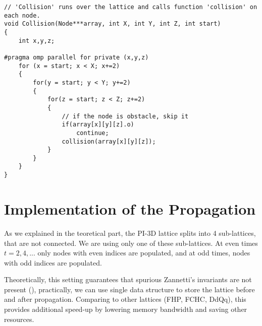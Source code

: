 \begin{lstlisting}
// 'Collision' runs over the lattice and calls function 'collision' on each node. 
void Collision(Node***array, int X, int Y, int Z, int start)
{
	int x,y,z;

#pragma omp parallel for private (x,y,z)
	for (x = start; x < X; x+=2)
	{
		for(y = start; y < Y; y+=2)
		{
			for(z = start; z < Z; z+=2)
			{
				// if the node is obstacle, skip it
				if(array[x][y][z].o)
					continue;
				collision(array[x][y][z]);
			}
		}
	}
}
\end{lstlisting}


\section{Implementation of the Propagation}


As we explained in the teoretical part, the PI-3D lattice splits into 4 sub-lattices, that are not connected. We are using only one of these sub-lattices. At even times $t=2,4,...$ only nodes with even indices are populated, and at odd times, nodes with odd indices are populated.

Theoretically, this setting guarantees that spurious Zannetti's invariants are not present (\cite{nasilowski}), practically, we can use single data structure to store the lattice before and after propagation. Comparing to other lattices (FHP, FCHC, DdQq), this provides additional speed-up by lowering memory bandwidth and saving other resources.

